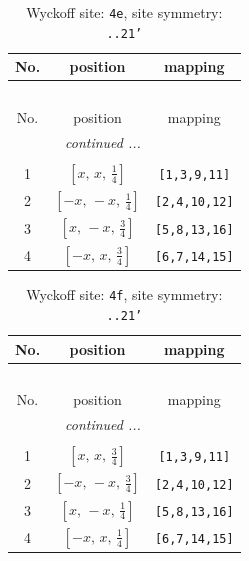 \documentclass[fleqn,8pt]{jsarticle}
\begin{document}
\begin{longtable}{ccc}
\caption{Wyckoff site: {\tt 4e}, site symmetry: {\tt ..21'}}
 \\
 \hline \hline
No. & position & mapping \\ \hline \endfirsthead

\multicolumn{2}{l}{\tablename\ \thetable{}} \\
 \hline \hline
No. & position & mapping \\ \hline \endhead

 \hline \hline
\multicolumn{2}{r}{\footnotesize\it continued ...} \\ \endfoot

 \hline \hline
\multicolumn{2}{r}{} \\ \endlastfoot

1 & $\left[ x,\, x,\, \frac{1}{4} \right]$ & {\tt [1,3,9,11]} \\ \hline
2 & $\left[ - x,\, - x,\, \frac{1}{4} \right]$ & {\tt [2,4,10,12]} \\ \hline
3 & $\left[ x,\, - x,\, \frac{3}{4} \right]$ & {\tt [5,8,13,16]} \\ \hline
4 & $\left[ - x,\, x,\, \frac{3}{4} \right]$ & {\tt [6,7,14,15]} \\
\end{longtable}
\renewcommand{\arraystretch}{1.2}
\begin{longtable}{ccc}
\caption{Wyckoff site: {\tt 4f}, site symmetry: {\tt ..21'}}
 \\
 \hline \hline
No. & position & mapping \\ \hline \endfirsthead

\multicolumn{2}{l}{\tablename\ \thetable{}} \\
 \hline \hline
No. & position & mapping \\ \hline \endhead

 \hline \hline
\multicolumn{2}{r}{\footnotesize\it continued ...} \\ \endfoot

 \hline \hline
\multicolumn{2}{r}{} \\ \endlastfoot

1 & $\left[ x,\, x,\, \frac{3}{4} \right]$ & {\tt [1,3,9,11]} \\ \hline
2 & $\left[ - x,\, - x,\, \frac{3}{4} \right]$ & {\tt [2,4,10,12]} \\ \hline
3 & $\left[ x,\, - x,\, \frac{1}{4} \right]$ & {\tt [5,8,13,16]} \\ \hline
4 & $\left[ - x,\, x,\, \frac{1}{4} \right]$ & {\tt [6,7,14,15]} \\
\end{longtable}
\end{document}
